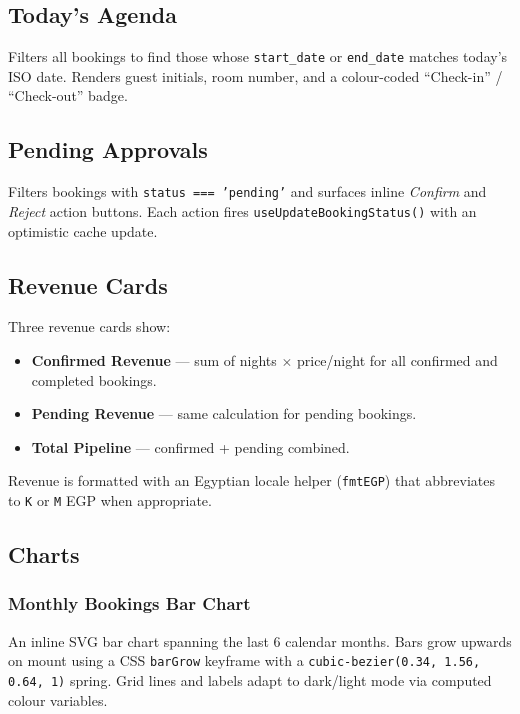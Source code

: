 \documentclass[12pt,a4paper]{report}
\begin{document}
\subsection{Today's Agenda}

Filters all bookings to find those whose \texttt{start\_date} or
\texttt{end\_date} matches today's ISO date. Renders guest initials, room
number, and a colour-coded ``Check-in'' / ``Check-out'' badge.

\subsection{Pending Approvals}

Filters bookings with \texttt{status === 'pending'} and surfaces inline
\emph{Confirm} and \emph{Reject} action buttons. Each action fires
\texttt{useUpdateBookingStatus()} with an optimistic cache update.

\subsection{Revenue Cards}

Three revenue cards show:
\begin{itemize}[leftmargin=2em]
  \item \textbf{Confirmed Revenue} — sum of nights $\times$ price/night for
        all confirmed and completed bookings.
  \item \textbf{Pending Revenue} — same calculation for pending bookings.
  \item \textbf{Total Pipeline} — confirmed + pending combined.
\end{itemize}

Revenue is formatted with an Egyptian locale helper (\texttt{fmtEGP}) that
abbreviates to \texttt{K} or \texttt{M} EGP when appropriate.

\subsection{Charts}

\subsubsection{Monthly Bookings Bar Chart}

An inline SVG bar chart spanning the last 6 calendar months. Bars grow
upwards on mount using a CSS \texttt{barGrow} keyframe with a
\texttt{cubic-bezier(0.34, 1.56, 0.64, 1)} spring. Grid lines and labels
adapt to dark/light mode via computed colour variables.
\end{document}
